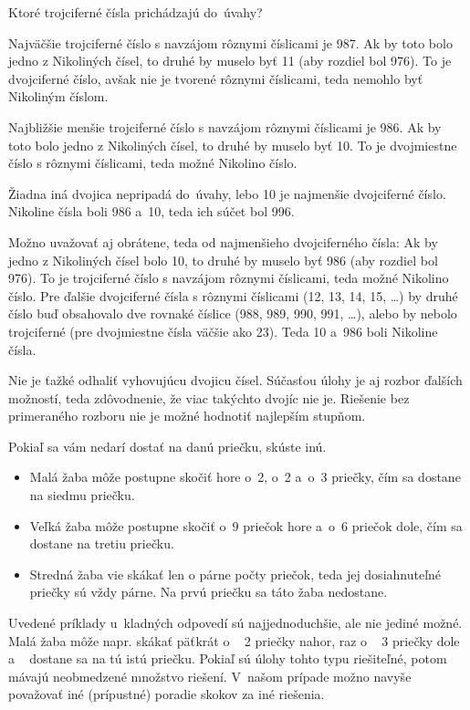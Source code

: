{%
\napad
Ktoré trojciferné čísla prichádzajú do~úvahy?

\riesenie
Najväčšie trojciferné číslo s navzájom rôznymi číslicami je 987.
Ak by toto bolo jedno z Nikoliných čísel, to druhé by muselo byť 11 (aby rozdiel bol 976).
To je dvojciferné číslo, avšak nie je tvorené rôznymi číslicami, teda nemohlo byť Nikoliným číslom.

Najbližšie menšie trojciferné číslo s navzájom rôznymi číslicami je 986.
Ak by toto bolo jedno z Nikoliných čísel, to druhé by muselo byť 10.
To je dvojmiestne číslo s rôznymi číslicami, teda možné Nikolino číslo.

Žiadna iná dvojica nepripadá do~úvahy, lebo 10 je najmenšie dvojciferné číslo.
Nikoline čísla boli 986 a~10, teda ich súčet bol 996.

\poznamky
Možno uvažovať aj obrátene, teda od najmenšieho dvojciferného čísla:
Ak by jedno z Nikoliných čísel bolo 10, to druhé by muselo byť 986 (aby rozdiel bol 976).
To je trojciferné číslo s navzájom rôznymi číslicami, teda možné Nikolino číslo.
Pre ďalšie dvojciferné čísla s rôznymi číslicami (12, 13, 14, 15, \dots) by druhé číslo buď obsahovalo dve rovnaké číslice (988, 989, 990, 991, \dots), alebo by nebolo trojciferné (pre dvojmiestne čísla väčšie ako 23).
Teda 10 a~986 boli Nikoline čísla.

Nie je ťažké odhaliť vyhovujúcu dvojicu čísel.
Súčasťou úlohy je aj rozbor ďalších možností, teda zdôvodnenie, že viac takýchto dvojíc nie je.
Riešenie bez primeraného rozboru nie je možné hodnotiť najlepším stupňom.
}

{%
\napad
Pokiaľ sa vám nedarí dostať na danú priečku, skúste inú.

\riesenie
\begin{itemize}
\item Malá žaba môže postupne skočiť hore o~2, o~2 a~o~3 priečky, čím sa dostane na siedmu priečku.
\item Veľká žaba môže postupne skočiť o~9 priečok hore a~o~6 priečok dole, čím sa dostane na tretiu priečku.
\item Stredná žaba vie skákať len o párne počty priečok, teda jej dosiahnuteľné priečky sú vždy párne.
Na prvú priečku sa táto žaba nedostane.
\end{itemize}

\poznamka
Uvedené príklady u~kladných odpovedí sú najjednoduchšie, ale nie jediné možné.
Malá žaba môže napr. skákať päťkrát o ~ 2 priečky nahor, raz o ~ 3 priečky dole a ~ dostane sa na tú istú priečku.
Pokiaľ sú úlohy tohto typu riešiteľné, potom mávajú neobmedzené množstvo riešení.
V~našom prípade možno navyše považovať iné (prípustné) poradie skokov za iné riešenia.}

